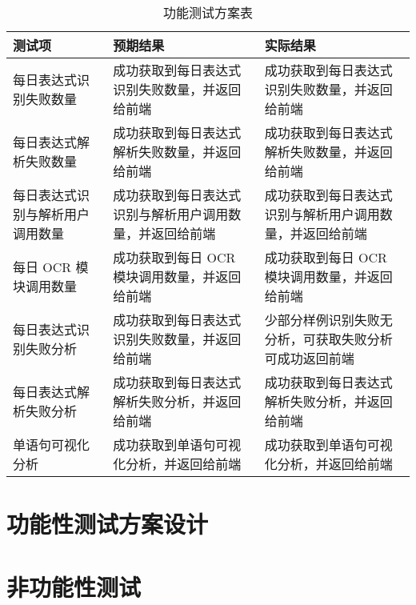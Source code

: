 \begin{table}[htb]
    \centering
    \caption{功能测试方案表}
    \begin{tabularx}{\linewidth}{|Y|Y|Y|}
        \hline
        测试项                           & 预期结果                                                 & 实际结果                                                 \\
        \hline
        每日表达式识别失败数量           & 成功获取到每日表达式识别失败数量，并返回给前端           & 成功获取到每日表达式识别失败数量，并返回给前端           \\
        \hline
        每日表达式解析失败数量           & 成功获取到每日表达式解析失败数量，并返回给前端           & 成功获取到每日表达式解析失败数量，并返回给前端           \\
        \hline
        每日表达式识别与解析用户调用数量 & 成功获取到每日表达式识别与解析用户调用数量，并返回给前端 & 成功获取到每日表达式识别与解析用户调用数量，并返回给前端 \\
        \hline
        每日 OCR 模块调用数量            & 成功获取到每日 OCR 模块调用数量，并返回给前端            & 成功获取到每日 OCR 模块调用数量，并返回给前端            \\
        \hline
        每日表达式识别失败分析           & 成功获取到每日表达式识别失败数量，并返回给前端           & 少部分样例识别失败无分析，可获取失败分析可成功返回前端   \\
        \hline
        每日表达式解析失败分析           & 成功获取到每日表达式解析失败分析，并返回给前端           & 成功获取到每日表达式解析失败分析，并返回给前端           \\
        \hline
        单语句可视化分析                 & 成功获取到单语句可视化分析，并返回给前端                 & 成功获取到单语句可视化分析，并返回给前端                 \\
        \hline
    \end{tabularx}
    \label{tab:functional_test}
\end{table}

\section{功能性测试方案设计}

\section{非功能性测试}

